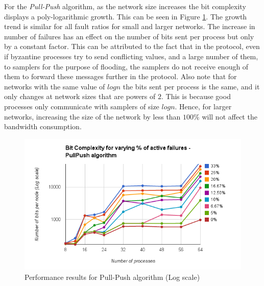 For the \textit{Pull-Push} algorithm, as the network size increases the bit
complexity displays a poly-logarithmic growth. This can be seen in Figure 
\ref{fig:pull_push}. The growth trend is similar for all fault ratios for small
and larger networks. The increase in number of failures has an effect on the
number of bits sent per process but only by a constant factor. This can be
attributed to the fact that in the protocol, even if byzantine processes try to
send conflicting values, and a large number of them, to samplers for the
purpose of flooding, the samplers do not receive enough of them to forward
these messages further in the protocol. Also note that for networks with the
same value of $logn$ the bits sent per process is the same, and it only changes
at network sizes that are powers of $2$. This is because good processes only
communicate with samplers of size $logn$. Hence, for larger networks,
increasing the size of the network by less than $100\%$ will not affect the
bandwidth consumption.  
\begin{figure}[ht] \centering 
    \includegraphics[scale=0.4]{pull_push} 
    \caption{Performance
    results for Pull-Push algorithm (Log scale)} \label{fig:pull_push}
    \end{figure}

